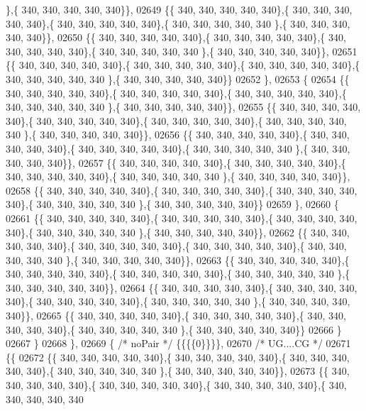 \begin{DoxyCode}
      \},\{ 340, 340, 340, 340, 340\}\},
02649 \{\{ 340, 340, 340, 340, 340\},\{ 340, 340, 340, 340, 340\},\{ 340, 340, 340, 340, 340\},\{ 340, 340, 340, 340, 340
      \},\{ 340, 340, 340, 340, 340\}\},
02650 \{\{ 340, 340, 340, 340, 340\},\{ 340, 340, 340, 340, 340\},\{ 340, 340, 340, 340, 340\},\{ 340, 340, 340, 340, 340
      \},\{ 340, 340, 340, 340, 340\}\},
02651 \{\{ 340, 340, 340, 340, 340\},\{ 340, 340, 340, 340, 340\},\{ 340, 340, 340, 340, 340\},\{ 340, 340, 340, 340, 340
      \},\{ 340, 340, 340, 340, 340\}\}
02652 \},
02653 \{
02654 \{\{ 340, 340, 340, 340, 340\},\{ 340, 340, 340, 340, 340\},\{ 340, 340, 340, 340, 340\},\{ 340, 340, 340, 340, 340
      \},\{ 340, 340, 340, 340, 340\}\},
02655 \{\{ 340, 340, 340, 340, 340\},\{ 340, 340, 340, 340, 340\},\{ 340, 340, 340, 340, 340\},\{ 340, 340, 340, 340, 340
      \},\{ 340, 340, 340, 340, 340\}\},
02656 \{\{ 340, 340, 340, 340, 340\},\{ 340, 340, 340, 340, 340\},\{ 340, 340, 340, 340, 340\},\{ 340, 340, 340, 340, 340
      \},\{ 340, 340, 340, 340, 340\}\},
02657 \{\{ 340, 340, 340, 340, 340\},\{ 340, 340, 340, 340, 340\},\{ 340, 340, 340, 340, 340\},\{ 340, 340, 340, 340, 340
      \},\{ 340, 340, 340, 340, 340\}\},
02658 \{\{ 340, 340, 340, 340, 340\},\{ 340, 340, 340, 340, 340\},\{ 340, 340, 340, 340, 340\},\{ 340, 340, 340, 340, 340
      \},\{ 340, 340, 340, 340, 340\}\}
02659 \},
02660 \{
02661 \{\{ 340, 340, 340, 340, 340\},\{ 340, 340, 340, 340, 340\},\{ 340, 340, 340, 340, 340\},\{ 340, 340, 340, 340, 340
      \},\{ 340, 340, 340, 340, 340\}\},
02662 \{\{ 340, 340, 340, 340, 340\},\{ 340, 340, 340, 340, 340\},\{ 340, 340, 340, 340, 340\},\{ 340, 340, 340, 340, 340
      \},\{ 340, 340, 340, 340, 340\}\},
02663 \{\{ 340, 340, 340, 340, 340\},\{ 340, 340, 340, 340, 340\},\{ 340, 340, 340, 340, 340\},\{ 340, 340, 340, 340, 340
      \},\{ 340, 340, 340, 340, 340\}\},
02664 \{\{ 340, 340, 340, 340, 340\},\{ 340, 340, 340, 340, 340\},\{ 340, 340, 340, 340, 340\},\{ 340, 340, 340, 340, 340
      \},\{ 340, 340, 340, 340, 340\}\},
02665 \{\{ 340, 340, 340, 340, 340\},\{ 340, 340, 340, 340, 340\},\{ 340, 340, 340, 340, 340\},\{ 340, 340, 340, 340, 340
      \},\{ 340, 340, 340, 340, 340\}\}
02666 \}
02667 \}
02668 \},
02669 \{ \textcolor{comment}{/* noPair */} \{\{\{\{0\}\}\}\},
02670 \textcolor{comment}{/* UG....CG */}
02671 \{\{
02672 \{\{ 340, 340, 340, 340, 340\},\{ 340, 340, 340, 340, 340\},\{ 340, 340, 340, 340, 340\},\{ 340, 340, 340, 340, 340
      \},\{ 340, 340, 340, 340, 340\}\},
02673 \{\{ 340, 340, 340, 340, 340\},\{ 340, 340, 340, 340, 340\},\{ 340, 340, 340, 340, 340\},\{ 340, 340, 340, 340, 340

\end{DoxyCode}

